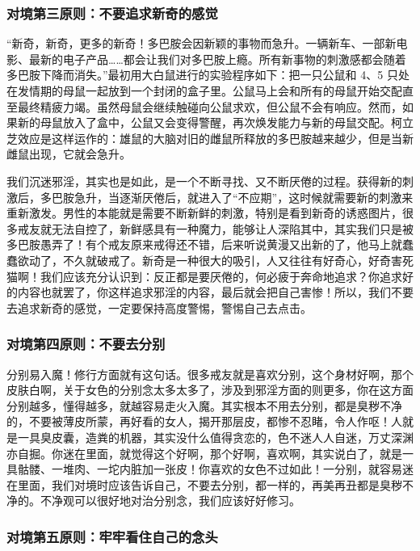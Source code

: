 \subsubsection{对境第三原则：不要追求新奇的感觉}

“新奇，新奇，更多的新奇！多巴胺会因新颖的事物而急升。一辆新车、一部新电影、最新的电子产品……都会让我们对多巴胺上瘾。所有新事物的刺激感都会随着多巴胺下降而消失。”最初用大白鼠进行的实验程序如下：把一只公鼠和 4、5 只处在发情期的母鼠一起放到一个封闭的盒子里。公鼠马上会和所有的母鼠开始交配直至最终精疲力竭。虽然母鼠会继续触碰向公鼠求欢，但公鼠不会有响应。然而，如果新的母鼠放入了盒中，公鼠又会变得警醒，再次焕发能力与新的母鼠交配。柯立芝效应是这样运作的：雄鼠的大脑对旧的雌鼠所释放的多巴胺越来越少，但是当新雌鼠出现，它就会急升。

我们沉迷邪淫，其实也是如此，是一个不断寻找、又不断厌倦的过程。获得新的刺激后，多巴胺急升，当逐渐厌倦后，就进入了“不应期”，这时候就需要新的刺激来重新激发。男性的本能就是需要不断新鲜的刺激，特别是看到新奇的诱惑图片，很多戒友就无法自控了，新鲜感具有一种魔力，能够让人深陷其中，其实我们只是被多巴胺愚弄了！有个戒友原来戒得还不错，后来听说黄漫又出新的了，他马上就蠢蠢欲动了，不久就破戒了。新奇是一种很大的吸引，人又往往有好奇心，好奇害死猫啊！我们应该充分认识到：反正都是要厌倦的，何必疲于奔命地追求？你追求好的内容也就罢了，你这样追求邪淫的内容，最后就会把自己害惨！所以，我们不要去追求新奇的感觉，一定要保持高度警惕，警惕自己去点击。

\subsubsection{对境第四原则：不要去分别}

分别易入魔！修行方面就有这句话。很多戒友就是喜欢分别，这个身材好啊，那个皮肤白啊，关于女色的分别念太多太多了，涉及到邪淫方面的则更多，你在这方面分别越多，懂得越多，就越容易走火入魔。其实根本不用去分别，都是臭秽不净的，不要被薄皮所蒙，再好看的女人，揭开那层皮，都惨不忍睹，令人作呕！人就是一具臭皮囊，造粪的机器，其实没什么值得贪恋的，色不迷人人自迷，万丈深渊亦自掘。你迷在里面，就觉得这个好啊，那个好啊，喜欢啊，其实说白了，就是一具骷髅、一堆肉、一坨内脏加一张皮！你喜欢的女色不过如此！一分别，就容易迷在里面，我们对境时应该告诉自己，不要去分别，都一样的，再美再丑都是臭秽不净的。不净观可以很好地对治分别念，我们应该好好修习。

\subsubsection{对境第五原则：牢牢看住自己的念头}


